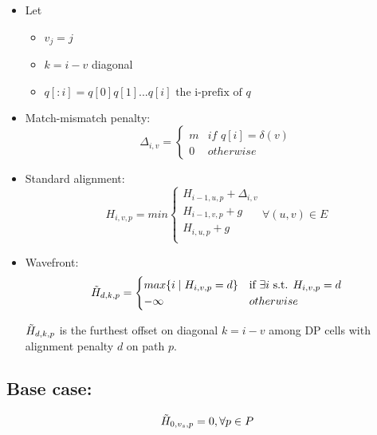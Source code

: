 \documentclass{article}
\begin{document}
\begin{itemize}

    \item Let
        \begin{itemize}
            \item $v_j = j$
            \item $k = i - v$ diagonal
            \item $q[:i] = q[0]q[1]...q[i] \text{ the i-prefix of } q$ 
        \end{itemize}  
    
    \item Match-mismatch penalty:
        \begin{equation}
            \Delta_{i, v} = \begin{cases}
                m & \textit{if } q[i] = \delta(v) \\
                0 & otherwise
                
            \end{cases}
        \end{equation}
    
    \item Standard alignment:
        \begin{equation}
            H_{i, v, p} = min \begin{cases}
                H_{i-1, u, p} + \Delta_{i, v} \\
                H_{i-1, v, p} + g \\
                H_{i, u, p} + g \\
            \end{cases} \forall (u,v) \in E
        \end{equation}

    \item Wavefront:
        \begin{equation}
            \Tilde{H}_{d,k,p} = \begin{cases}
                max\{i \mid H_{i,v,p} = d \} & \text{if } \exists i \text{ s.t. } H_{i,v,p} = d \\
                - \infty & otherwise
            \end{cases}    
        \end{equation}

        $\Tilde{H}_{d,k,p}$ is the furthest offset on diagonal $k = i - v$ among DP cells with alignment penalty $d$ on path $p$.        
\end{itemize}

\subsection{Base case:}
$$\Tilde{H}_{0, v_s, p} = 0, \forall p \in P$$
\end{document}
